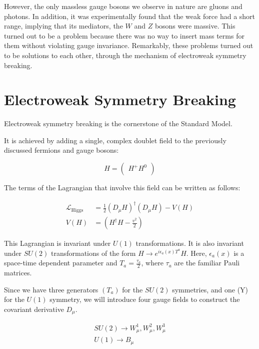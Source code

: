 However, the only massless gauge bosons we observe in nature are gluons and photons. In addition, it was experimentally found that the weak force had a short range, implying that its mediators, the $W$ and $Z$ bosons were massive. This turned out to be a problem because there was no way to insert mass terms for them without violating gauge invariance. Remarkably, these problems turned out to be solutions to each other, through the mechanism of electroweak symmetry breaking.

\section{Electroweak Symmetry Breaking}

Electroweak symmetry breaking is the cornerstone of the Standard Model. 

It is achieved by adding a single, complex doublet field to the previously discussed fermions and gauge bosons:

$$H = \begin{pmatrix}H^{+}H^0\\\end{pmatrix}$$

The terms of the Lagrangian that involve this field can be written as follows:

\begin{align*}
  \mathcal{L}_{\text{Higgs}} &= \frac{1}{2}(D_\mu H)^\dag(D_\mu H)-V(H)\\
  V(H) &= \left(H^\dag H-\frac{v^2}{2}\right)
\end{align*}

This Lagrangian is invariant under $U(1)$ transformations. It is also invariant under $SU(2)$ transformations of the form $H\rightarrow e^{i\epsilon_a(x)T^a}H$. Here, $\epsilon_a (x)$ is a space-time dependent parameter and $T_a = \frac{\tau_a}{2}$, where $\tau_a$ are the familiar Pauli matrices.

Since we have three generators $(T_a)$ for the $SU(2)$ symmetries, and one (Y) for the $U(1)$ symmetry, we will introduce four gauge fields to construct the covariant derivative $D_\mu$.

\begin{align*}
  SU(2)\rightarrow W_\mu^1,W_\mu^2, W_\mu^3\\
  U(1)\rightarrow B_\mu
\end{align*}

